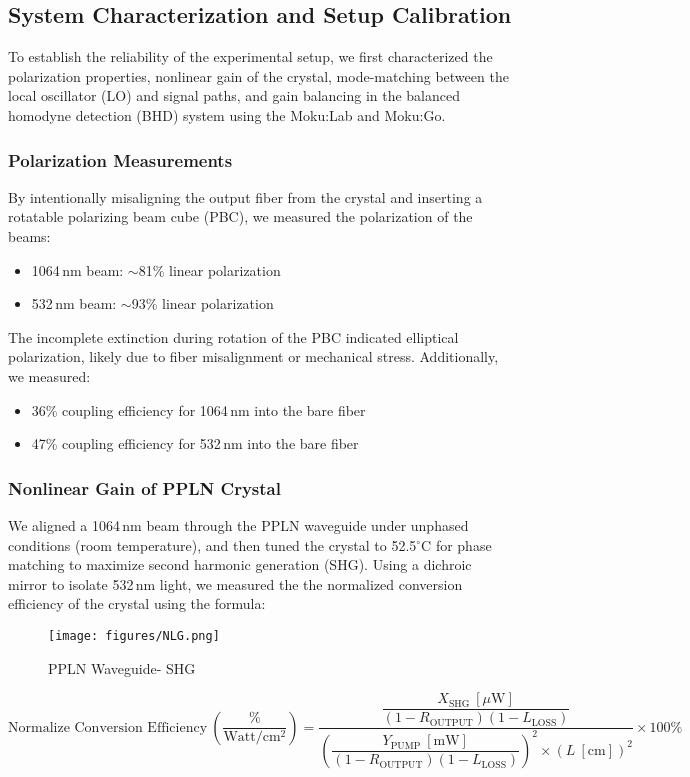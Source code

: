 \documentclass[colorlinks=true,pdfstartview=FitV,linkcolor=blue,
citecolor=red,urlcolor=magenta]{ligodoc}
\begin{document}
\subsection{System Characterization and Setup Calibration}

To establish the reliability of the experimental setup, we first characterized the polarization properties, nonlinear gain of the crystal, mode-matching between the local oscillator (LO) and signal paths, and gain balancing in the balanced homodyne detection (BHD) system using the Moku:Lab and Moku:Go.

\subsubsection{Polarization Measurements}

By intentionally misaligning the output fiber from the crystal and inserting a rotatable polarizing beam cube (PBC), we measured the polarization of the beams:
\begin{itemize}
    \item 1064\,nm beam: $\sim$81\% linear polarization
    \item 532\,nm beam: $\sim$93\% linear polarization
\end{itemize}
The incomplete extinction during rotation of the PBC indicated elliptical polarization, likely due to fiber misalignment or mechanical stress. Additionally, we measured:
\begin{itemize}
    \item 36\% coupling efficiency for 1064\,nm into the bare fiber
    \item 47\% coupling efficiency for 532\,nm into the bare fiber
\end{itemize}

\subsubsection{Nonlinear Gain of PPLN Crystal}

We aligned a 1064\,nm beam through the PPLN waveguide under unphased conditions (room temperature), and then tuned the crystal to 52.5$^\circ$C for phase matching to maximize second harmonic generation (SHG). Using a dichroic mirror to isolate 532\,nm light, we measured the the normalized conversion efficiency of the crystal using the formula:
\begin{figure}[H]
    \centering
    \texttt{[image: figures/NLG.png]}
   \caption{  PPLN Waveguide- SHG \cite{manual}}
    \label{fig:enter-label}
\end{figure}
\[
\text{Normalize Conversion Efficiency}~\left(\frac{\%}{\text{Watt}/\text{cm}^2}\right) = 
\frac{
    \dfrac{X_{\text{SHG}}~[\mu\text{W}]}{(1 - R_{\text{OUTPUT}})(1 - L_{\text{LOSS}})}
}{
    \left( \dfrac{Y_{\text{PUMP}}~[\text{mW}]}{(1 - R_{\text{OUTPUT}})(1 - L_{\text{LOSS}})} \right)^2 \times (L~[\text{cm}])^2
}
\times 100\%
\]
\end{document}
